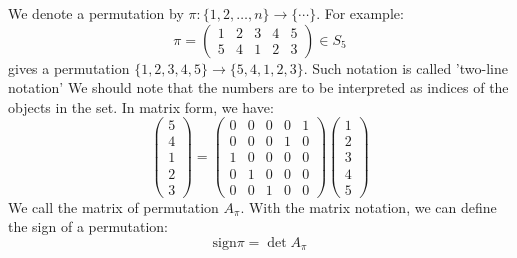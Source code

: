 \documentclass{amsart}
\begin{document}
We denote a permutation by $\pi\colon \{1,2,\dots,n\} \to \{ \cdots \}$. For example:
\[
    \pi = \left(  
    \begin{matrix} 
    1&2&3&4&5\\
    5&4&1&2&3
    \end{matrix}
    \right) \in S_5
\]
gives a permutation $\{1,2,3,4,5\} \to \{ 5,4,1,2,3 \}$. Such notation is called 'two-line notation'
We should note that the numbers are to be interpreted as indices of the objects in the set.
In matrix form, we have:
\begin{equation}
    \left( \begin{matrix} 5 \\ 4 \\ 1 \\ 2\\ 3 \end{matrix} \right)
    = \left( \begin{matrix} 
        0 & 0 & 0 & 0 & 1 \\
        0 & 0 & 0 & 1 & 0 \\
        1 & 0 & 0 & 0 & 0 \\
        0 & 1 & 0 & 0 & 0 \\
        0 & 0 & 1 & 0 & 0 
    \end{matrix} \right) 
    \left( \begin{matrix} 1 \\ 2 \\ 3 \\ 4 \\ 5 \end{matrix} \right)
\end{equation}
We call the matrix of permutation $A_{\pi}$. 
With the matrix notation, we can define the sign of a permutation:
\[\text{sign}\pi = \det A_{\pi}\]
\end{document}
